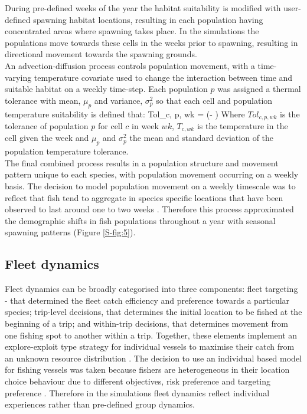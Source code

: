 \documentclass[review]{elsarticle}
\let\oldequation\equation
\let\oldendequation\endequation
\renewenvironment{equation}
 {\linenomathNonumbers\oldequation}
 {\oldendequation\endlinenomath}
\begin{document}
During pre-defined weeks of the year the habitat suitability is modified with
user-defined spawning habitat locations, resulting in each population having
concentrated areas where spawning takes place. In the simulations the
populations move towards these cells in the weeks prior to spawning, resulting
in directional movement towards the spawning grounds. \\

An advection-diffusion process controls population movement, with a
time-varying temperature covariate used to change the interaction between time
and suitable habitat on a weekly time-step. Each population $p$ was assigned a
thermal tolerance with mean, $\mu_{p}$ and variance, $\sigma^2_{p}$ so that
each cell and population temperature suitability is defined that:
\begin{equation}
	Tol_{c, p, wk} =  \cdot \exp(-
		 )	
\end{equation}
Where $Tol_{c, p, wk}$ is the tolerance of population $p$ for cell $c$ in week
$wk$, $T_{c, wk}$ is the temperature in the cell given the week and $\mu_{p}$
and $\sigma^2_{p}$ the mean and standard deviation of the population
temperature tolerance. \\

The final combined process results in a population structure and movement
pattern unique to each species, with population movement occurring on a weekly
basis. The decision to model population movement on a weekly timescale was to
reflect that fish tend to aggregate in species specific locations that have
been observed to last around one to two weeks \citep{Poos2007}. Therefore this
process approximated the demographic shifts in fish populations throughout a
year with seasonal spawning patterns (Figure \ref{S-fig:5}).

\subsection{Fleet dynamics}

Fleet dynamics can be broadly categorised into three components: fleet
targeting - that determined the fleet catch efficiency and preference towards a
particular species; trip-level decisions, that determines the initial location
to be fished at the beginning of a trip; and within-trip decisions, that
determines movement from one fishing spot to another within a trip. Together,
these elements implement an explore-exploit type strategy for individual
vessels to maximise their catch from an unknown resource distribution
\citep{Bailey2018}. The decision to use an individual based model for fishing
vessels was taken because fishers are heterogeneous in their location choice
behaviour due to different objectives, risk preference and targeting preference
\citep{VanPutten2012a}. Therefore in the simulations fleet dynamics reflect
individual experiences rather than pre-defined group dynamics. 
\end{document}
